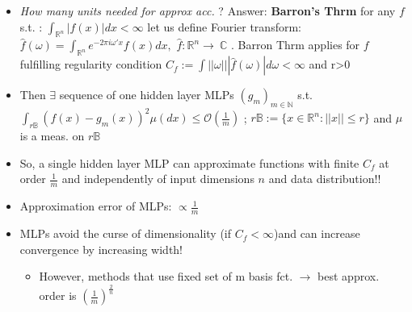 \begin{itemize}
\item \textit{How many units needed for approx acc. }? Answer:\textbf{ Barron's Thrm} for any \(f\) s.t. : \(\int_{\mathbb{R}^n}|f(x)|dx<\infty\) let us define Fourier transform: \(\hat{f}(\omega)=\int_{\mathbb{R}^n }e^{-2\pi i \omega'x}f(x)dx, \) \(\hat{f}:\mathbb{R}^n\rightarrow\ \mathbb{C}\) . Barron Thrm applies for \(f\) fulfilling regularity condition \(C_f:= \int ||\omega|||\hat{f}(\omega)|d\omega < \infty\) and r>0
\item Then \( \exists \) sequence of one hidden layer MLPs \((g_m)_{m\in \mathbb{N}}\) s.t. \(\int_{r\mathbb{B}}(f(x)-g_m(x))^2\mu(dx) \leq \mathcal{O}(\frac{1}{m})\) ; \(r\mathbb{B}:=\{x\in \mathbb{R}^n:||x||\leq r\}\) and \(\mu\) is a meas. on \(r\mathbb{B}\)
\item So, a single hidden layer MLP can approximate functions with finite \(C_f\) at order \(\frac{1}{m}\) and independently of input dimensions \(n\) and data distribution!!
\item Approximation error of MLPs: \(\propto \frac{1}{m}\)
\item  MLPs avoid the curse of dimensionality (if \(C_f <\infty\))and can increase convergence by increasing width!
\begin{itemize}
    \item However, methods that use fixed set of m basis fct. \(\rightarrow\) best approx. order is \((\frac{1}{m})^\frac{2}{n}\)
\end{itemize}

\end{itemize}
